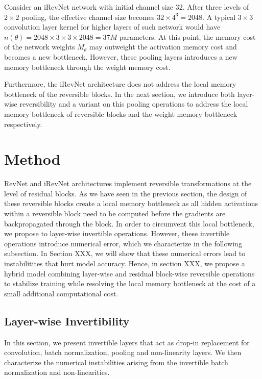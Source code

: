 \documentclass[twocolumn]{bmcart}
\begin{document}
Consider an iRevNet network with initial channel size 32.
After three levels of $2 \times 2$ pooling, the effective channel size becomes $32 \times 4^3=2048$. A typical $3 \times 3$ convolution layer kernel for higher layers of such network would have $n(\theta)=2048 \times 3 \times 3 \times 2048=37M$ parameters.
At this point, the memory cost of the network weights $M_{\theta}$ may outweight the activation memory cost and becomes a new bottleneck.
However, these pooling layers introduces a new memory bottleneck through the weight memory cost.

Furthermore, the iRevNet architecture does not address the local memory bottleneck of the reversible blocks. 
In the next section, we introduce both layer-wise reversibility and a variant on this pooling operations to address the local memory bottleneck of reversible blocks and the weight memory bottleneck respectively.

\section{Method}

RevNet and iRevNet architectures implement reversible transformations at the level of residual blocks. 
As we have seen in the previous section, the design of these reversible blocks create a local memory bottleneck as all hidden activations within a reversible block need to be computed before the gradients are backpropagated through the block. 
In order to circumvent this local bottleneck, we propose to layer-wise invertible operations. 
However, these invertible operations introduce numerical error, which we characterize in the following subsection. 
In Section XXX, we will show that these numerical errors lead to instabilitites that hurt model accuracy. 
Hence, in section XXX, we propose a hybrid model combining layer-wise and residual block-wise reversible operations to stabilize training while resolving the local memory bottleneck at the cost of a small additional computational cost.

\subsection{Layer-wise Invertibility}

In this section, we present invertible layers that act as drop-in replacement for convolution, batch normalization, pooling and non-linearity layers. We then characterize the numerical instabilities arising from the invertible batch normalization and non-linearities.
\end{document}
